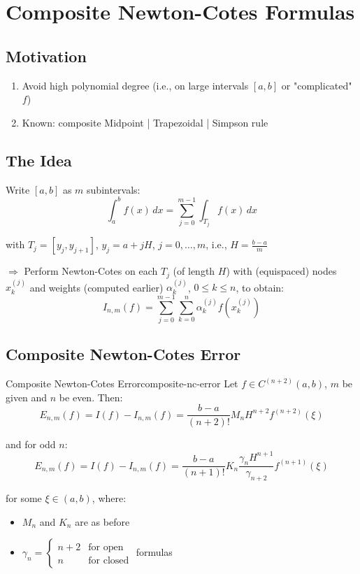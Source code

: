\section{Composite Newton-Cotes Formulas}

\subsection{Motivation}

\begin{enumerate}
    \item Avoid high polynomial degree (i.e., on large intervals $[a,b]$ or "complicated" $f$)
    \item Known: composite Midpoint | Trapezoidal | Simpson rule
\end{enumerate}

\subsection{The Idea}

Write $[a,b]$ as $m$ subintervals:
\[\int_a^b f(x) \, dx = \sum_{j=0}^{m-1} \int_{T_j} f(x) \, dx\]

with $T_j = [y_j, y_{j+1}]$, $y_j = a + jH$, $j = 0, \ldots, m$, i.e., $H = \frac{b-a}{m}$

$\Rightarrow$ Perform Newton-Cotes on each $T_j$ (of length $H$) with (equispaced) nodes $x_k^{(j)}$ and weights (computed earlier) $\alpha_k^{(j)}$, $0 \leq k \leq n$, to obtain:
\[I_{n,m}(f) = \sum_{j=0}^{m-1} \sum_{k=0}^n \alpha_k^{(j)} f(x_k^{(j)})\]

\subsection{Composite Newton-Cotes Error}

\begin{theorem}{Composite Newton-Cotes Error}{composite-nc-error}
Let $f \in C^{(n+2)}(a,b)$, $m$ be given and $n$ be even. Then:
\[E_{n,m}(f) = I(f) - I_{n,m}(f) = \frac{b-a}{(n+2)!} M_n H^{n+2} f^{(n+2)}(\xi)\]

and for odd $n$:
\[E_{n,m}(f) = I(f) - I_{n,m}(f) = \frac{b-a}{(n+1)!} K_n \frac{\gamma_n H^{n+1}}{\gamma_{n+2}} f^{(n+1)}(\xi)\]

for some $\xi \in (a,b)$, where:
\begin{itemize}
    \item $M_n$ and $K_n$ are as before
    \item $\gamma_n = \begin{cases} n+2 & \text{for open} \\ n & \text{for closed} \end{cases}$ formulas
\end{itemize}
\end{theorem}

